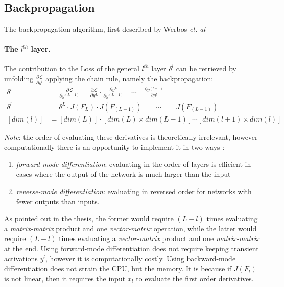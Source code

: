 \subsection{Backpropagation}
The backpropagation algorithm, first described by Werbos \emph{et. al} \cite{werbos1994roots}
\paragraph{The $l^{th}$ layer.} 
The contribution to the Loss of the general $l^{th}$ layer $\delta^l$ can be retrieved by unfolding $\frac{\partial \mathcal{L}}{\partial y^l}$ applying the chain rule, namely the backpropagation:
\begin{equation}\label{backprop}
\begin{split}
    \delta^l &= 
    \frac{\partial \mathcal{L}}{\partial y^{(L-1)}} = 
    \frac{\partial \mathcal{L}}{\partial y^{L}} \cdot
    \frac{\partial y^{L}}{\partial y^{(L-1)}} \quad \cdots \quad
    \frac{\partial y^{(l+1)}}{\partial y^{l}} \\
    \delta^l &= \delta^L \cdot J(F_L) \cdot J(F_{(L-1)}) \qquad \cdots \qquad J(F_{(L-1)})\\
    \left[dim(l)\right] &= \left[dim(L)\right] \cdot \left[dim(L)\times dim(L-1)\right] \cdots \left[dim(l+1)\times dim(l)\right]
\end{split}   
\end{equation}

\emph{Note}: the order of evaluating these derivatives is theoretically irrelevant, 
however computationally there is an opportunity to implement it in two ways \cite{akthesis}:
\begin{enumerate}
    \item[] \emph{forward-mode differentiation}: evaluating in the order of layers is efficient in cases where the output of the network is much larger than the input
    \item[] \emph{reverse-mode differentiation}: evaluating in reversed order for networks with fewer outputs than inputs.
\end{enumerate}
As pointed out in the thesis, the former would require $(L-l)$  times evaluating a \emph{matrix-matrix} product and one \emph{vector-matrix} operation,
while the latter would require $(L-l)$ times evaluating a \emph{vector-matrix} product and one \emph{matrix-matrix} at the end. 
Using forward-mode differentiation does not require keeping transient activations $y^l$, however it is computationally costly.
Using backward-mode differentiation does not strain the CPU, but the memory. 
It is because if $J(F_l)$ is not linear, then it requires the input $x_l$ to evaluate the first order derivatives.

